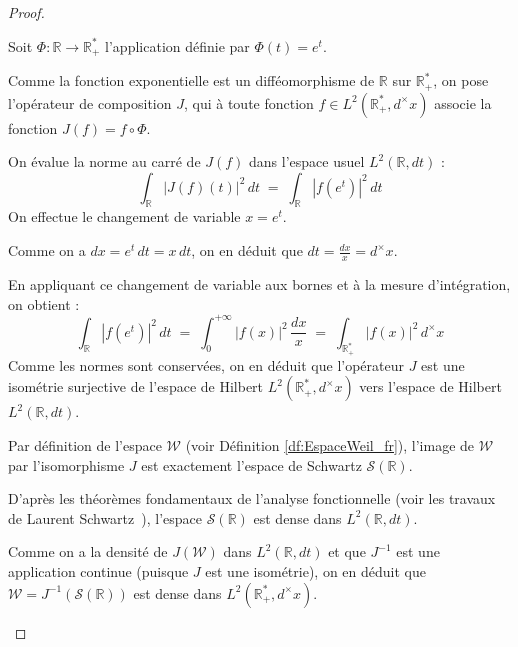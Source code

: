 \documentclass[Riemann_Hypothesis.tex]{subfiles}
\begin{document}
\begin{proof}
    \begin{part_proof}
        Soit $\Phi : \mathbb{R} \to \mathbb{R}_+^*$ l'application définie par $\Phi(t) = e^t$. \par
        Comme la fonction exponentielle est un difféomorphisme de $\mathbb{R}$ sur $\mathbb{R}_+^*$, on pose l'opérateur de composition $J$, qui à toute fonction $f \in L^2(\mathbb{R}_+^*, d^\times x)$ associe la fonction $J(f) = f \circ \Phi$. \par
        On évalue la norme au carré de $J(f)$ dans l'espace usuel $L^2(\mathbb{R}, dt)$ :
        \begin{equation*}
            \int_{\mathbb{R}} \left| J(f)(t) \right|^2 \, dt \;=\; \int_{\mathbb{R}} \left| f(e^t) \right|^2 \, dt
        \end{equation*}
        On effectue le changement de variable $x = e^t$. \par
        Comme on a $dx = e^t \, dt = x \, dt$, on en déduit que $dt = \frac{dx}{x} = d^\times x$. \par
        En appliquant ce changement de variable aux bornes et à la mesure d'intégration, on obtient :
        \begin{equation*}
            \int_{\mathbb{R}} \left| f(e^t) \right|^2 \, dt \;=\; \int_{0}^{+\infty} \left| f(x) \right|^2 \, \frac{dx}{x} \;=\; \int_{\mathbb{R}_+^*} \left| f(x) \right|^2 \, d^\times x
        \end{equation*}
        Comme les normes sont conservées, on en déduit que l'opérateur $J$
        est une isométrie surjective de l'espace de Hilbert
        $L^2(\mathbb{R}_+^*, d^\times x)$ vers l'espace de Hilbert
        $L^2(\mathbb{R}, dt)$. \medskip\par
        Par définition de l'espace $\mathcal{W}$
        (voir Définition \ref{df:EspaceWeil_fr}),
        l'image de $\mathcal{W}$ par l'isomorphisme $J$ est exactement
        l'espace de Schwartz $\mathcal{S}(\mathbb{R})$. \par
        D'après les théorèmes fondamentaux de l'analyse fonctionnelle
        (voir les travaux de Laurent Schwartz~\cite{schwartz1966_distributions}), 
        l'espace $\mathcal{S}(\mathbb{R})$ est dense dans $L^2(\mathbb{R}, dt)$. \par
        Comme on a la densité de $J(\mathcal{W})$ dans $L^2(\mathbb{R}, dt)$ et que $J^{-1}$ 
        est une application continue (puisque $J$ est une isométrie), on en déduit que 
        $\mathcal{W} = J^{-1}(\mathcal{S}(\mathbb{R}))$ est dense dans 
        $L^2(\mathbb{R}_+^*, d^\times x)$.
    \end{part_proof}
\end{proof}
\end{document}

